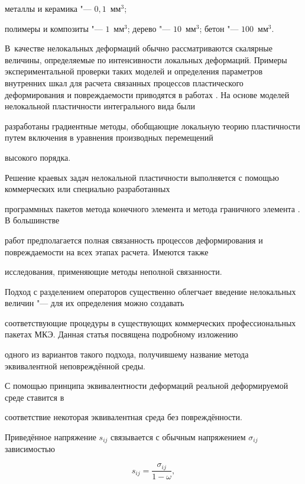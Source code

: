 металлы и керамика "--- $0,1$~мм$^3$;

полимеры и композиты "--- $1$~мм$^3$; дерево "--- $10$~мм$^3$; бетон "--- $100$~мм$^3$. 

В~качестве нелокальных деформаций обычно рассматриваются скалярные величины, определяемые по интенсивности локальных деформаций. Примеры экспериментальной проверки таких моделей и определения параметров внутренних шкал для расчета связанных процессов пластического деформирования и повреждаемости приводятся в работах \cite{kleb11:bib7,kleb11:bib8}. На основе моделей нелокальной пластичности интегрального вида были

разработаны градиентные методы, обобщающие локальную теорию пластичности путем включения в уравнения производных перемещений

высокого порядка.



Решение краевых задач нелокальной пластичности выполняется с помощью коммерческих \cite{kleb11:bib9} или специально разработанных

программных пакетов метода конечного элемента \cite{kleb11:bib10} и метода граничного элемента \cite{kleb11:bib11}. В большинстве

работ предполагается полная связанность процессов деформирования и повреждаемости на всех этапах расчета. Имеются также

исследования, применяющие методы неполной связанности.



Подход с разделением операторов существенно облегчает введение нелокальных величин "--- для их определения можно создавать

соответствующие процедуры в существующих коммерческих профессиональных пакетах МКЭ. Данная статья посвящена подробному изложению

одного из вариантов такого подхода, получившему название метода эквивалентной неповреждённой среды.



\smallskip



 С помощью принципа эквивалентности деформаций реальной деформируемой среде ставится в

соответствие некоторая эквивалентная среда без повреждённости. 

Приведённое напряжение $s_{ij}$  связывается с обычным напряжением $\sigma_{ij}$ зависимостью

\begin{equation}

\label{kleb11:eq1}

s_{ij}=\frac{\sigma_{ij}}{1-\omega},

\end{equation}

